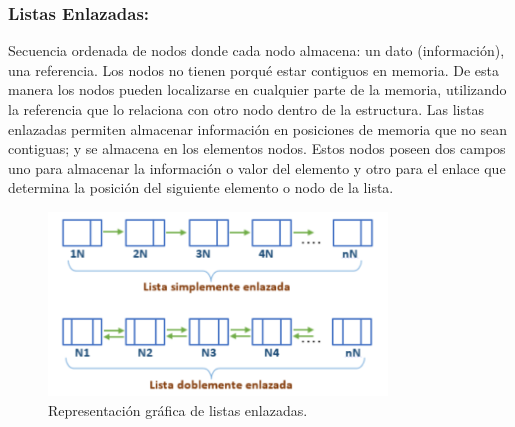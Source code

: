 \documentclass[12pt,letterpaper]{article}
\begin{document}
\subsubsection{Listas Enlazadas:}
Secuencia ordenada de nodos donde cada nodo almacena: un dato (información), una referencia. Los nodos no tienen porqué estar contiguos en memoria. De esta manera los nodos pueden localizarse en cualquier parte de la memoria, utilizando la referencia que lo relaciona con otro nodo dentro de la estructura.
Las listas enlazadas permiten almacenar información en posiciones de memoria que no sean contiguas; y se almacena en los elementos nodos. Estos nodos poseen dos campos uno para almacenar la información o valor del elemento y otro para el enlace que determina la posición del siguiente elemento o nodo de la lista.
\begin{figure}[h]
\begin{center}
\includegraphics[width=9cm]{./Imagenes/listas.png}
\caption{Representación gráfica de listas enlazadas.}
\label{rg2}
\end{center}
\end{figure}
\vspace*{-0.4in}
\end{document}
